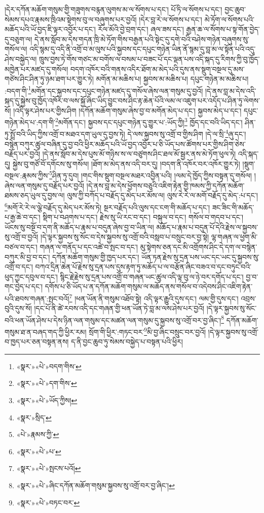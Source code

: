 །དེར་དཀོན་མཆོག་གསུམ་གྱི་གཟུགས་བརྙན་ལུགས་མ་ལ་སོགས་པ་དང་། པོ་ཏི་ལ་སོགས་པ་དང་། བྱང་ཆུབ་སེམས་དཔའ་རྣམས་ཁྲིའམ་སྟེགས་བུ་ལ་བཞུགས་པར་བྱའོ། །དེར་བླ་རེ་ལ་སོགས་པ་དང་། མེ་ཏོག་ལ་སོགས་པའི་མཆོད་པའི་ཡོ་བྱད་ཇི་ལྟར་འབྱོར་པ་དང་། རོལ་མོའི་བྱེ་བྲག་དང་། ཞལ་ཟས་དང་། རྒྱན་ཆ་ལ་སོགས་པ་སྟ་གོན་བྱེད་དུ་བཅུག་ལ། དེ་ནས་སློབ་མ་དེས་གདན་ཁྲི་མེ་ཏོག་གིས་བརྒྱན་པའི་སྟེང་དུ་དགེ་བའི་བཤེས་གཉེན་བཞུགས་སུ་གསོལ་ལ། འདི་སྙམ་དུ་འདི་ནི་འགྲོ་བ་མ་ལུས་པའི་སྐྱབས་དང་དཔུང་གཉེན་ཡིན་ནོ་སྙམ་དུ་བླ་མ་ལ་སྟོན་པའི་འདུ་ཤེས་བསྐྱེད་ལ། ཁྲུས་བྱས་ཏེ་གོས་གཙང་མ་བགོས་ལ་བསམ་པ་བཟང་པོ་དང་ལྡན་པས་འདི་སྐད་དུ་རིགས་ཀྱི་བུ་ཁྱོད་མཁྱེན་པར་མཛད་དུ་གསོལ། བདག་འཁོར་བའི་གནས་འདིར་ཐོག་མ་མེད་པའི་དུས་ནས་སྡུག་བསྔལ་དུ་མས་གཙེས་ཤིང་ཤིན་ཏུ་ཉམ་ཐག་པར་གྱུར་ཏེ། མགོན་མ་མཆིས་པ། སྐྱབས་མ་མཆིས་པ། དཔུང་གཉེན་མ་མཆིས་པ། :བདག་གི་\footnote{«སྣར་»«པེ་»བདག་གིས་}མགོན་དང་སྐྱབས་དང་དཔུང་གཉེན་མཛད་དུ་གསོལ་ཞེས་ལན་གསུམ་དུ་བྱའོ། །དེ་ནས་བླ་མ་དེས་འདི་སྐད་དུ་སྐྱེས་བུ་ཁྱོད་འཁོར་བ་ལས་སྐྱོ་ཞིང་ཡིད་བྱུང་བས་ཤིང་རྟ་ཆེན་པོའི་ལམ་ལ་འཇུག་པར་འདོད་པ་ཤིན་ཏུ་ལེགས་སོ། །འདི་ལྟར་ཤེས་པར་གྱིས་ཤིག །དཀོན་མཆོག་གསུམ་ཞེས་བྱ་བ་མགོན་མེད་པ་དང་། སྐྱབས་མེད་པ་དང་། དཔུང་གཉེན་མེད་པ་:དག་གི་\footnote{«སྣར་»«པེ་»དག་གིས་}མགོན་དང་། སྐྱབས་དང་དཔུང་གཉེན་དུ་གྱུར་པ་:ཡོད་ཀྱི།\footnote{«སྣར་»«པེ་»ཡོད་ཀྱིས།} ཁྱོད་དང་བའི་ཡིད་དང་། ཤིན་ཏུ་སྤྲོ་བའི་ཡིད་ཀྱིས་འགྲོ་བ་མཐའ་དག་ཡུལ་དུ་བྱས་ཏེ། དེ་ལས་སྐྱབས་སུ་འགྲོ་བ་གྱིས་ཤིག །དེ་ལ་སྲི་\footnote{«སྣར་»སྲིད་}ཞུ་དང་། བསྙེན་བཀུར་ཚུལ་བཞིན་དུ་བྱ་བའི་ཕྱིར་མཆོད་པའི་ཡོ་བྱད་འབྱོར་པ་ཅི་ཡོད་པས་ཚོགས་པར་གྱིས་ཤིག་ཅེས་བརྗོད་པར་བྱའོ། །དེ་ནས་སློབ་མ་དེས་པུས་མོ་གཉིས་ས་ལ་བཙུགས་ཤིང་ཐལ་མོ་སྦྱར་ནས་མེ་ཏོག་ཕུལ་ཏེ། འདི་སྐད་དུ། སྐྱེས་བུ་གཙོ་བོ་དགོངས་སུ་གསོལ། །ཐོག་མ་མེད་ནས་འདི་བར་དུ། །བདག་ནི་འཁོར་བར་འཁོར་གྱུར་ཏེ། །སྡུག་བསྔལ་:རྣམས་ཀྱིས་\footnote{«པེ་»རྣམས་ཀྱི་}ཤིན་ཏུ་དུབ། །གང་གིས་སྡུག་བསྔལ་མཐར་འབྱིན་པའི། །ལམ་དེ་ཁྱོད་ཀྱིས་བསྟན་དུ་གསོལ། །ཞེས་ལན་གསུམ་དུ་བརྗོད་པར་བྱའོ། །དེ་ནས་བླ་མ་དེས་ཕྱོགས་བཅུའི་འཇིག་རྟེན་གྱི་ཁམས་ཀྱི་དཀོན་མཆོག་ཐམས་ཅད་ཡུལ་དུ་བྱས་ལ། ལུས་ཀྱི་བཀོད་པ་བརྗོད་དུ་མེད་པར་མོས་ལ། ལུས་རེ་རེ་ལ་མགོ་བརྗོད་དུ་མེད་:པ་དང་། \footnote{«སྣར་»«པེ་»པ་}མགོ་རེ་རེ་ལ་ལྕེ་བརྗོད་དུ་མེད་པར་མོས་ཏེ། སྔར་བརྗོད་པའི་ལུས་དང་ངག་གི་མཆོད་པ་དང་། ཟང་ཟིང་གི་མཆོད་པ་རྒྱ་ཆེ་བ་དང་། སྡིག་པ་བཤགས་པ་དང་། རྗེས་སུ་ཡི་རང་བ་དང་། བསྐུལ་བ་དང་། གསོལ་བ་གདབ་པ་དང་། ཡོངས་སུ་བསྔོ་བ་དག་ནི་མཆོད་པ་རྣམ་པ་བདུན་ཞེས་བྱ་བ་ཡིན་ལ། མཆོད་པ་རྣམ་པ་བདུན་པོ་དེའི་རྗེས་ལ་སྐྱབས་སུ་འགྲོ་བ་བྱའོ། །དེ་ལྟར་སྐྱབས་སུ་སོང་བ་དེས་སྐྱབས་སུ་འགྲོ་བའི་བསླབ་པ་བསྲུང་བར་བྱ་སྟེ། ལྷ་གཞན་ལ་ཕྱག་མི་བཙལ་བ་དང་། གཞན་ལ་གནོད་པ་དང་འཚེ་བ་སྤང་བ་དང་། མུ་སྟེགས་ཅན་དང་མི་འགྲོགས་ཤིང་དེ་དག་ལ་བསྙེན་བཀུར་མི་བྱ་བ་དང་། དཀོན་མཆོག་གསུམ་གྱི་ཁྱད་པར་དང་། ཡོན་ཏན་རྗེས་སུ་དྲན་པས་ཡང་དང་ཡང་དུ་སྐྱབས་སུ་འགྲོ་བ་དང་། བཀའ་དྲིན་ཆེན་པོ་རྗེས་སུ་དྲན་པས་དུས་རྟག་ཏུ་མཆོད་པ་ལ་བརྩོན་ཞིང་བཟའ་བ་དང་བཏུང་བའི་ཕུད་ཀྱང་དབུལ་བ་དང་། སྙིང་རྗེ་རྗེས་སུ་དྲན་པས་འགྲོ་བ་གཞན་ཡང་ཚུལ་འདི་ལྟ་བུ་ལ་ཉེ་བར་དགོད་པ་དང་། བྱ་བ་གང་བྱེད་པ་དང་། དགོས་པ་ཅི་ཡོད་པ་ན་དཀོན་མཆོག་གསུམ་ལ་མཆོད་ནས་གསོལ་བ་འདེབས་ཤིང་འཇིག་རྟེན་པའི་ཐབས་གཞན་:སྤང་བའོ།\footnote{«སྣར་»«པེ་»སྤངས་པའོ།} །ཕན་ཡོན་ནི་གསུམ་འཐོབ་སྟེ། འདི་ལྟར་རྒྱུའི་དུས་དང་། ལམ་གྱི་དུས་དང་། འབྲས་བུའི་དུས་སོ། །དང་པོ་ནི་ཚེ་རབས་འདི་དང་གཞན་གྱི་ཕན་ཡོན་ཏེ་བླ་མ་ལས་ཤེས་པར་བྱའོ། །དེ་ལྟར་སྐྱབས་སུ་སོང་བའི་ཕན་ཡོན་ཤེས་པ་དེས་ཉིན་ལན་གསུམ་དང་མཚན་ལན་གསུམ་དུ་སྐྱབས་སུ་འགྲོ་བར་བྱ་ཞིང་།\footnote{«སྣར་»«པེ་»ཞིང་དཀོན་མཆོག་གསུམ་སྐྱབས་སུ་འགྲོ་བར་བྱ་ཞིང་།} དཀོན་མཆོག་གསུམ་ཐ་ན་བཞད་གད་ཀྱི་ཕྱིར་རམ། སྲོག་གི་ཕྱིར་:གཏང་བར་\footnote{«སྣར་»«པེ་»བཏང་བར་}མི་བྱ་ཞིང་བསྲུང་བར་བྱའོ། །དེ་ལྟར་སྐྱབས་སུ་འགྲོ་བ་ཁྱད་པར་ཅན་བསྟན་ནས། ད་ནི་བྱང་ཆུབ་ཏུ་སེམས་བསྐྱེད་པ་བསྟན་པའི་ཕྱིར། 